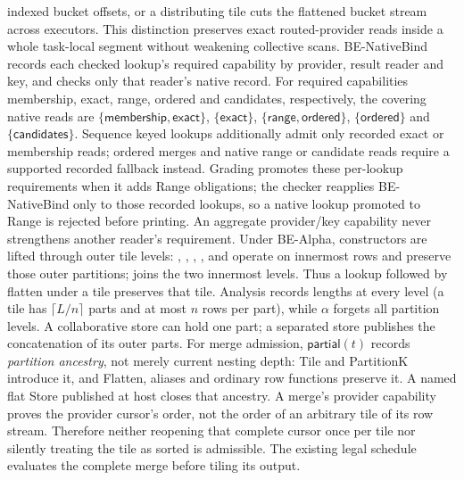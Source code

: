 indexed bucket offsets, or a distributing tile cuts the flattened bucket
stream across executors. This distinction preserves exact routed-provider
reads inside a whole task-local segment without weakening collective scans.
BE-NativeBind records each checked lookup's required capability by provider,
result reader and key, and checks only that reader's native record.
For required capabilities membership,
exact, range, ordered and candidates, respectively, the covering native reads
are $\{\mathsf{membership},\mathsf{exact}\}$, $\{\mathsf{exact}\}$,
$\{\mathsf{range},\mathsf{ordered}\}$, $\{\mathsf{ordered}\}$ and
$\{\mathsf{candidates}\}$. Sequence keyed lookups additionally admit only
recorded exact or membership reads; ordered merges and native range or
candidate reads require a supported recorded fallback instead.
Grading promotes these per-lookup requirements when it adds Range obligations;
the checker reapplies BE-NativeBind only to those recorded lookups,
so a native lookup promoted to Range is rejected before printing. An aggregate
provider/key capability never strengthens another reader's requirement.
Under BE-Alpha, constructors are lifted through outer tile levels:
, , , ,  and
 operate on innermost rows and preserve those outer partitions;
 joins the two innermost levels. Thus a lookup followed by
flatten under a tile preserves that tile. Analysis records lengths at every
level (a tile has $\lceil L/n\rceil$ parts and at most $n$ rows per part),
while $\alpha$ forgets all partition levels. A collaborative store can hold
one part; a separated store publishes the concatenation of its outer parts.
For merge admission, $\mathsf{partial}(t)$ records \emph{partition ancestry},
not merely current nesting depth: Tile and PartitionK introduce it, and
Flatten, aliases and ordinary row functions preserve it. A named flat Store
published at host closes that ancestry. A merge's provider capability proves
the provider cursor's order, not the order of an arbitrary tile of its row
stream. Therefore neither reopening that complete cursor once per tile nor
silently treating the tile as sorted is admissible. The existing legal
schedule evaluates the complete merge before tiling its output.
